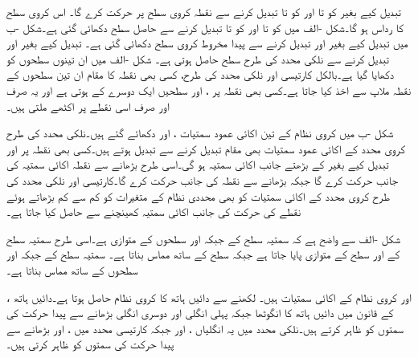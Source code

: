  تبدیل کیے بغیر  کو  تا  اور  کو  تا  تبدیل کرنے سے  نقطہ  کروی  سطح  پر حرکت کرے گا۔ اس کروی سطح کا رداس  ہو گا۔شکل -الف  میں  کو  تا  اور  کو  تا  تبدیل کرنے سے حاصل سطح  دکھائی گئی ہے۔شکل -ب میں  تبدیل کیے بغیر  اور  تبدیل کرنے سے پیدا مخروط    کروی سطح دکھائی گئی ہے۔ تبدیل کیے بغیر  اور  تبدیل کرنے سے  نلکی محدد کی طرح  سطح حاصل ہوتی ہے۔ شکل -الف میں ان تینوں سطحوں کو دکھایا گیا ہے۔بالکل کارتیسی اور نلکی محدد کی طرح، کسی بھی نقطہ  کا مقام ان تین سطحوں کے نقطہ ملاپ سے اخذ کیا جاتا ہے۔کسی بھی نقطہ  پر ،  اور  سطحیں  ایک دوسرے کے   ہوتی ہے اور یہ صرف اور صرف اسی نقطے پر اکٹھے ملتی ہیں۔

شکل -ب میں کروی نظام کے تین  اکائی  عمود سمتیات ،  اور  دکھائے گئے ہیں۔نلکی محدد کی طرح کروی محدد کے اکائی عمود سمتیات بھی مقام تبدیل کرنے سے تبدیل ہوتے ہیں۔کسی بھی نقطہ  پر  اور  تبدیل کیے بغیر  کے بڑھتے جانب اکائی سمتیہ  ہو گی۔اسی طرح  بڑھانے سے نقطہ  اکائی سمتیہ  کی جانب حرکت کرے گا جبکہ  بڑھانے سے نقطہ  کی جانب حرکت کرے گا۔کارتیسی اور نلکی محدد کی طرح کروی محدد کے اکائی سمتیات کو بھی محددی نظام کے متغیرات کو کم سے کم بڑھاتے ہوئے  نقطے کی حرکت کی جانب اکائی سمتیہ کھینچنے سے حاصل کیا جاتا ہے۔

شکل -الف سے واضح ہے کہ  سمتیہ  سطح کے  جبکہ  اور  سطحوں کے متوازی ہے۔اسی طرح  سمتیہ  سطح کے  اور  سطح کے متوازی پایا جاتا ہے جبکہ  سطح کے ساتھ مماس بناتا ہے۔ سمتیہ  سطح کے  جبکہ  اور  سطحوں کے ساتھ مماس بناتا ہے۔

 
،  اور  کروی نظام  کے اکائی سمتیات ہیں۔ لکھنے سے  دائیں ہاتھ کا کروی نظام حاصل ہوتا ہے۔دائیں ہاتھ کے قانون میں دائیں ہاتھ کا انگوٹھا   جبکہ پہلی انگلی   اور دوسری انگلی  بڑھانے سے پیدا حرکت کی سمتوں کو ظاہر کرتے ہیں۔نلکی محدد میں یہ انگلیاں ،  اور  جبکہ کارتیسی محدد میں ،  اور  بڑھانے سے پیدا حرکت کی سمتوں کو ظاہر کرتی ہیں۔

